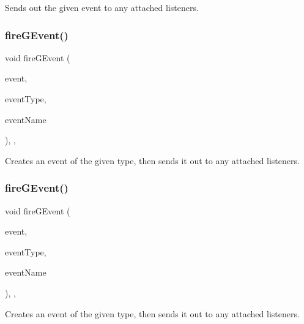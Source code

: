 Sends out the given event to any attached listeners. 

\mbox{\label{classGObservable_ab3983ea07337b52020a29cc00c653d8d}} 
\subsubsection{\texorpdfstring{fire\+G\+Event()}{fireGEvent()}\hspace{0.1cm}{\footnotesize\ttfamily [1/8]}}
{\footnotesize\ttfamily void fire\+G\+Event (\begin{DoxyParamCaption}\item[{Q\+Event $\ast$}]{event,  }\item[{Event\+Type}]{event\+Type,  }\item[{const std\+::string \&}]{event\+Name }\end{DoxyParamCaption})\hspace{0.3cm}{\ttfamily [protected]}, {\ttfamily [virtual]}, {\ttfamily [inherited]}}



Creates an event of the given type, then sends it out to any attached listeners. 

\mbox{\label{classGObservable_a01fdf1b0e0dbd49e189fe4514e010411}} 
\subsubsection{\texorpdfstring{fire\+G\+Event()}{fireGEvent()}\hspace{0.1cm}{\footnotesize\ttfamily [2/8]}}
{\footnotesize\ttfamily void fire\+G\+Event (\begin{DoxyParamCaption}\item[{Q\+Close\+Event $\ast$}]{event,  }\item[{Event\+Type}]{event\+Type,  }\item[{const std\+::string \&}]{event\+Name }\end{DoxyParamCaption})\hspace{0.3cm}{\ttfamily [protected]}, {\ttfamily [virtual]}, {\ttfamily [inherited]}}



Creates an event of the given type, then sends it out to any attached listeners. 

